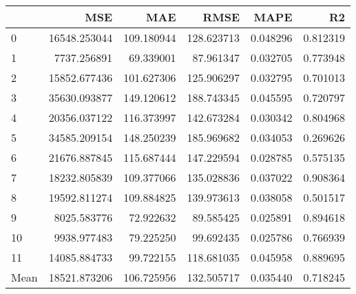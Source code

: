 \begin{tabular}{lrrrrr}
\toprule
 & MSE & MAE & RMSE & MAPE & R2 \\
\midrule
0 & 16548.253044 & 109.180944 & 128.623713 & 0.048296 & 0.812319 \\
1 & 7737.256891 & 69.339001 & 87.961347 & 0.032705 & 0.773948 \\
2 & 15852.677436 & 101.627306 & 125.906297 & 0.032795 & 0.701013 \\
3 & 35630.093877 & 149.120612 & 188.743345 & 0.045595 & 0.720797 \\
4 & 20356.037122 & 116.373997 & 142.673284 & 0.030342 & 0.804968 \\
5 & 34585.209154 & 148.250239 & 185.969682 & 0.034053 & 0.269626 \\
6 & 21676.887845 & 115.687444 & 147.229594 & 0.028785 & 0.575135 \\
7 & 18232.805839 & 109.377066 & 135.028836 & 0.037022 & 0.908364 \\
8 & 19592.811274 & 109.884825 & 139.973613 & 0.038058 & 0.501517 \\
9 & 8025.583776 & 72.922632 & 89.585425 & 0.025891 & 0.894618 \\
10 & 9938.977483 & 79.225250 & 99.692435 & 0.025786 & 0.766939 \\
11 & 14085.884733 & 99.722155 & 118.681035 & 0.045958 & 0.889695 \\
Mean & 18521.873206 & 106.725956 & 132.505717 & 0.035440 & 0.718245 \\
\bottomrule
\end{tabular}
